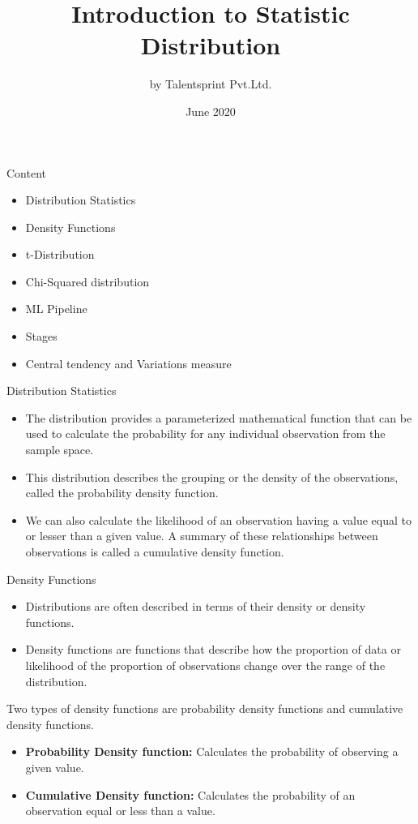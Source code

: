 \documentclass{beamer}
\title{Introduction to Statistic Distribution}
\author{by Talentsprint Pvt.Ltd.}
\date{June 2020}
\begin{document}
\maketitle
\begin{frame}{Content}
	\begin{itemize}
		\item Distribution Statistics
		\item Density Functions
		\item t-Distribution
		\item Chi-Squared distribution
		\item ML Pipeline
		\item Stages
		\item Central tendency and Variations measure
	\end{itemize}
\end{frame}
\begin{frame}{Distribution Statistics}
\begin{itemize}
    \item The distribution provides a parameterized mathematical function that can be used to calculate the probability for any individual observation from the sample space. 
\vspace{10pt}
    \item This distribution describes the grouping or the density of the observations, called the probability density function. 
\vspace{10pt}
	\item We can also calculate the likelihood of an observation having a value equal to or lesser than a given value. A summary of these relationships between observations is called a cumulative density function.
\end{itemize}
\end{frame}
\begin{frame}{Density Functions}
	\begin{itemize}
		\item Distributions are often described in terms of their density or density functions.
		\item Density functions are functions that describe how the proportion of data or likelihood of the proportion of observations change over the range of the distribution.
	\end{itemize}
\justify
	Two types of density functions are probability density functions and cumulative density functions.
	\begin{itemize}
		\item \textbf{Probability Density function:} Calculates the probability of observing a given value.
		\item \textbf{Cumulative Density function:} Calculates the probability of an observation equal or less than a value.
	\end{itemize}
\end{frame}
\end{document}
